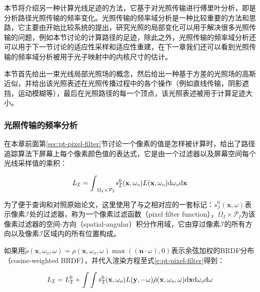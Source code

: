 本节将介绍另一种计算光线足迹的方法，它基于对光照传输进行傅里叶分析，即是分析路径光照传输的频率变化。光照传输的频率域分析是一种比较重要的方法和思路，它主要由\cite{a:AFrequencyAnalysisofLightTransport}开始比较系统的提出，研究光照的局部变化可以用于解决很多光照传输的问题，例如本节讨论的计算路径的足迹，除此之外，光照传输的频率域分析还可以用于下一节讨论的适应性采样和适应性重建，在下一章我们还可以看到光照传输的频率域分析被用于光子映射中的内核尺寸的估计。

本节首先给出一束光线局部光照场的概念，然后给出一种基于方差的光照场的高斯近似，并给出该光照表述在光照传播过程中的各个操作（例如直线传输，阴影遮挡，运动模糊等），最后在光照路径的每一个顶点，该光照表述被用于计算足迹大小。





\subsubsection{光照传输的频率分析}\label{sec:pt-frequency-analysis}
在本章前面第\ref{sec:pt-pixel-filter}节讨论一个像素的值是怎样被计算时，给出了路径追踪算法下屏幕上每个像素颜色值的表达式，它是由一个过滤器以及屏幕空间每个光线采样值的乘积：

\begin{equation}\label{e:pt-pixel-filter}
	L_{\mathcal{I}}={\rm \int}_{\Omega_I\times\mathcal{P}_I}s^{0}_{\mathcal{I}}(\mathbf{x},\omega_{o})L(\mathbf{x},\omega_{o}){\rm d}\omega_{o}{\rm d}\mathbf{x}
\end{equation}

为了便于查询和对照原始论文，这里使用了与之相对应的一套标记：$s^{0}_{\mathcal{I}}(\mathbf{x},\omega)$表示像素$\mathcal{I}$处的过滤器，称为一个像素过滤函数（pixel filter function），$\Omega_I\times\mathcal{P}_I$为该像素过滤器的空间-方向（spatial-angular）积分作用域，它由穿过像素$\mathcal{I}$的所有方向以及像素$\mathcal{I}$区域内的所有位置构成。

如果用$\tilde{\rho}(\mathbf{x},\omega_o,\omega)=\rho (\mathbf{x},\omega_o,\omega)\max{((\mathbf{n}\cdot\omega),0)}$表示余弦加权的BRDF分布（cosine-weighted BRDF），并代入渲染方程至式\ref{e:pt-pixel-filter}得到：

\begin{equation}
	L_{\mathcal{I}}=L^{0}_{\mathcal{I}}+{\rm \int}\int s^{0}_{\mathcal{I}}(\mathbf{x},\omega_{o})L(\mathbf{y},-\omega)\tilde{\rho}(\mathbf{x},\omega_o,\omega){\rm d}\mathbf{x}{\rm d}\omega_o {\rm d}\omega
\end{equation}

